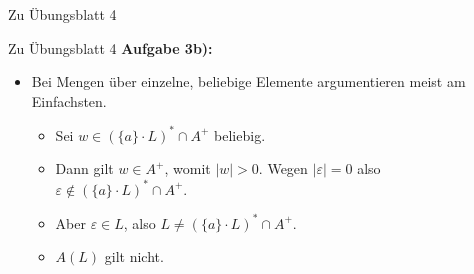 {\begin{frame}{Zu Übungsblatt 4}
\end{frame}

\begin{frame}{Zu Übungsblatt 4}
	\textbf{Aufgabe 3b):}
	\begin{itemize}
		\item Bei Mengen über einzelne, beliebige Elemente argumentieren meist am Einfachsten. \begin{itemize}
			\item Sei $w \in (\{a\}\cdot L)^\ast \cap A^+$ beliebig.
			\item Dann gilt $w \in A^+$, womit $|w| > 0$. Wegen $|\varepsilon| = 0$ also $\varepsilon \notin (\{a\}\cdot L)^\ast \cap A^+$.
			\item Aber $\varepsilon \in L$, also $L \ne (\{a\}\cdot L)^\ast \cap A^+$.
			\item $A(L)$ gilt nicht.
		\end{itemize}
	\end{itemize}
\end{frame}

}